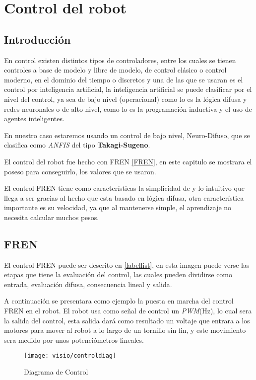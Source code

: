 
    \chapter{Control del robot}
    \section{Introducción}
    En control existen distintos tipos de controladores, entre los cuales se tienen controles a base de modelo y libre de modelo, de control clásico o control moderno, en el dominio del tiempo o discretos y una de las que se usaran es el control por inteligencia artificial, la inteligencia artificial se puede clasificar por el nivel del control, ya sea de bajo nivel (operacional) como lo es la lógica difusa y redes neuronales o de alto nivel, como lo es la programación inductiva y el uso de agentes inteligentes.
    
    En nuestro caso estaremos usando un control de bajo nivel, Neuro-Difuso, que se clasifica como \textit{ANFIS} del tipo \textbf{Takagi-Sugeno}.
        
    El control del robot fue hecho con FREN \ref{FREN}, en este capitulo se mostrara el poseso para conseguirlo, los valores que se usaron.
    
    El control FREN tiene como características la simplicidad de y lo intuitivo que llega a ser gracias al hecho que esta basado en lógica difusa, otra característica importante es su velocidad, ya que al mantenerse simple, el aprendizaje no necesita calcular muchos pesos.




    \section{FREN}	
    El control FREN puede ser descrito en \cref{labellist}, en esta imagen puede verse las etapas que tiene la evaluación del control,  las cuales pueden dividirse como entrada, evaluación difusa, consecuencia lineal y salida.
    
    
    A continuación se presentara como ejemplo la puesta en marcha del control FREN en el robot.
    El robot usa como señal de control un \textit{PWM}(Hz), lo cual sera la salida del control, esta salida dará como resultado un voltaje que entrara a los motores para mover al robot a lo largo de un tornillo sin fin, y este movimiento sera medido por unos potenciómetros lineales.
    
    
\begin{figure}[h]
	\centering
	\texttt{[image: visio/controldiag]}
	\caption{Diagrama de Control}
	\label{fig:controldiag}
\end{figure}


